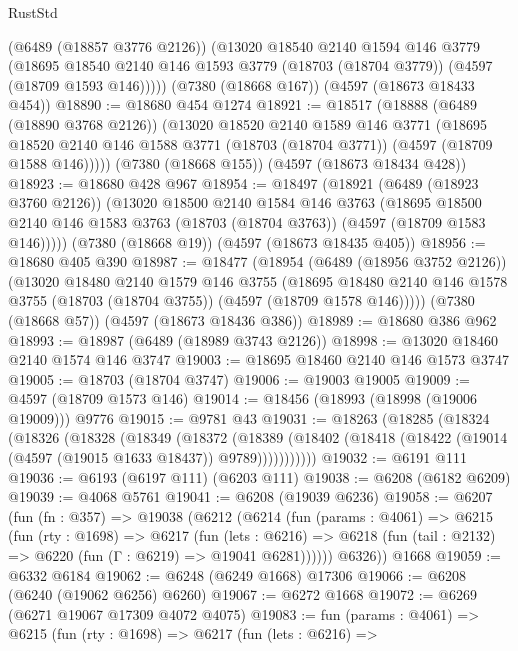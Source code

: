 \begin{lexlean}{RustStd}
\begin{coremodule}
      (@6489 (@18857 @3776 @2126))
      (@13020
        @18540
        @2140
        @1594
        @146
        @3779
        (@18695 @18540 @2140 @146 @1593 @3779 (@18703 (@18704 @3779)) (@4597 (@18709 @1593 @146)))))
    (@7380 (@18668 @167))
    (@4597 (@18673 @18433 @454))
@18890 := @18680 @454 @1274
@18921 := @18517
    (@18888
      (@6489 (@18890 @3768 @2126))
      (@13020
        @18520
        @2140
        @1589
        @146
        @3771
        (@18695 @18520 @2140 @146 @1588 @3771 (@18703 (@18704 @3771)) (@4597 (@18709 @1588 @146)))))
    (@7380 (@18668 @155))
    (@4597 (@18673 @18434 @428))
@18923 := @18680 @428 @967
@18954 := @18497
    (@18921
      (@6489 (@18923 @3760 @2126))
      (@13020
        @18500
        @2140
        @1584
        @146
        @3763
        (@18695 @18500 @2140 @146 @1583 @3763 (@18703 (@18704 @3763)) (@4597 (@18709 @1583 @146)))))
    (@7380 (@18668 @19))
    (@4597 (@18673 @18435 @405))
@18956 := @18680 @405 @390
@18987 := @18477
    (@18954
      (@6489 (@18956 @3752 @2126))
      (@13020
        @18480
        @2140
        @1579
        @146
        @3755
        (@18695 @18480 @2140 @146 @1578 @3755 (@18703 (@18704 @3755)) (@4597 (@18709 @1578 @146)))))
    (@7380 (@18668 @57))
    (@4597 (@18673 @18436 @386))
@18989 := @18680 @386 @962
@18993 := @18987 (@6489 (@18989 @3743 @2126))
@18998 := @13020 @18460 @2140 @1574 @146 @3747
@19003 := @18695 @18460 @2140 @146 @1573 @3747
@19005 := @18703 (@18704 @3747)
@19006 := @19003 @19005
@19009 := @4597 (@18709 @1573 @146)
@19014 := @18456 (@18993 (@18998 (@19006 @19009))) @9776
@19015 := @9781 @43
@19031 := @18263
    (@18285
      (@18324
        (@18326
          (@18328
            (@18349
              (@18372
                (@18389
                  (@18402 (@18418 (@18422 (@19014 (@4597 (@19015 @1633 @18437)) @9789)))))))))))
@19032 := @6191 @111
@19036 := @6193 (@6197 @111) (@6203 @111)
@19038 := @6208 (@6182 @6209)
@19039 := @4068 @5761
@19041 := @6208 (@19039 @6236)
@19058 := @6207
    (fun (fn : @357) =>
    @19038
      (@6212
        (@6214
          (fun (params : @4061) =>
          @6215
            (fun (rty : @1698) =>
            @6217
              (fun (lets : @6216) =>
              @6218 (fun (tail : @2132) => @6220 (fun (Γ : @6219) => @19041 @6281))))))
        @6326))
    @1668
@19059 := @6332 @6184
@19062 := @6248 (@6249 @1668) @17306
@19066 := @6208 (@6240 (@19062 @6256) @6260)
@19067 := @6272 @1668
@19072 := @6269 (@6271 @19067 @17309 @4072 @4075)
@19083 := fun (params : @4061) =>
  @6215
    (fun (rty : @1698) =>
    @6217
      (fun (lets : @6216) =>

\end{coremodule}
\end{lexlean}
